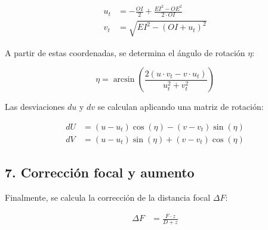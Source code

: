 \begin{align}
u_t &= -\frac{OI}{2} + \frac{EI^2 - OE^2}{2 \cdot OI} \\
v_t &= \sqrt{EI^2 - (OI + u_t)^2}
\end{align}

A partir de estas coordenadas, se determina el ángulo de rotación $\eta$:

\begin{equation}
\eta = \arcsin\left(\frac{2(u \cdot v_t - v \cdot u_t)}{u_t^2 + v_t^2}\right)
\end{equation}

Las desviaciones $du$ y $dv$ se calculan aplicando una matriz de rotación:

\begin{align}
dU &= (u - u_t)\cos(\eta) - (v - v_t)\sin(\eta) \\
dV &= (u - u_t)\sin(\eta) + (v - v_t)\cos(\eta)
\end{align}

\subsection*{7. Corrección focal y aumento}

Finalmente, se calcula la corrección de la distancia focal $\Delta F$:

\begin{align}
\Delta F &= \frac{F \cdot z}{D + z} \\
\end{align}

